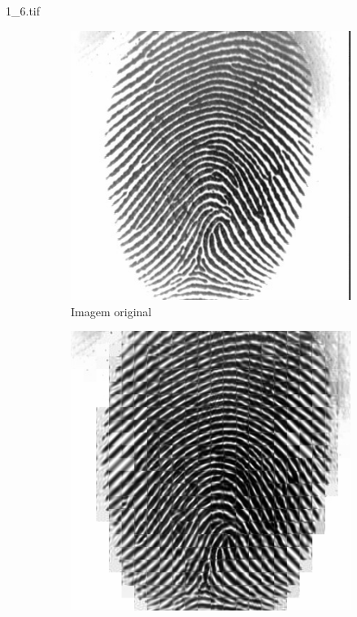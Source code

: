 \documentclass{beamer}
\begin{document}
    \begin{frame}{1\_6.tif}
        \begin{figure}
            \centering
            \begin{subfigure}[!ht]{0.32\textwidth}
                \includegraphics[width=\columnwidth]{Fingerprints/1_6.jpg}
                \caption{Imagem original}
            \end{subfigure}
            \begin{subfigure}[!ht]{0.32\textwidth}
                \includegraphics[width=\columnwidth]{Fingerprints/1_6_intermediate.jpg}

\end{subfigure}
\end{figure}
\end{frame}
\end{document}
